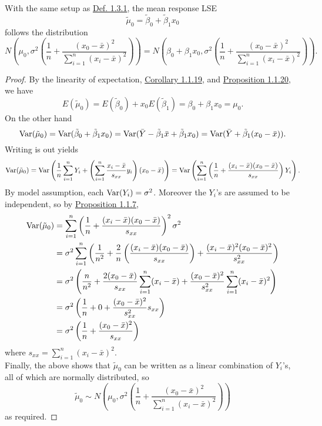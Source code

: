 \documentclass[11pt,fleqn]{book} %
\begin{document}
\begin{proposition} \label{prop:132}
With the same setup as \hyperref[def:131]{Def. 1.3.1}, the mean response LSE
\[
\tilde{\mu}_0 = \tilde{\beta}_0 + \tilde{\beta}_1x_0
\]
follows the distribution
\[
N\left(\mu_0, \sigma^2\left(\frac1n + \frac{(x_0 - \bar{x})^2}{\sum_{i=1}^n(x_i - \bar{x})^2}\right)\right) = N\left(\beta_0 + \beta_1x_0, \sigma^2\left(\frac1n + \frac{(x_0 - \bar{x})^2}{\sum_{i=1}^n(x_i - \bar{x})^2}\right)\right).
\]
\end{proposition}
\begin{proof} By the linearity of expectation, \hyperref[cor:1119]{Corollary 1.1.19}, and \hyperref[prop:1121]{Proposition 1.1.20}, we have
\[
E(\tilde{\mu}_0) = E(\tilde{\beta}_0) + x_0E(\tilde{\beta}_1) = \beta_0 + \beta_1x_0 = \mu_0.
\]
\indent On the other hand
\[
\operatorname{Var}(\tilde{\mu}_0) = \operatorname{Var}(\tilde{\beta}_0 + \tilde{\beta}_1x_0) = \operatorname{Var}(\bar{Y} - \tilde{\beta}_1\bar{x} + \tilde{\beta}_1x_0) = \operatorname{Var}(\bar{Y} + \tilde{\beta}_1(x_0 - \bar{x})).
\]
\indent Writing is out yields
\[
\operatorname{Var}(\tilde{\mu}_0) = \operatorname{Var}\left(\frac1n\sum_{i=1}^nY_i + \left(\sum_{i=1}^n\frac{x_i - \bar{x}}{s_{xx}}y_i\right)(x_0 - \bar{x})\right) = \operatorname{Var}\left(\sum_{i=1}^n\left(\frac1n + \frac{(x_i - \bar{x})(x_0 - \bar{x})}{s_{xx}}\right)Y_i\right).
\]
\indent By model assumption, each \(\operatorname{Var}(Y_i) = \sigma^2\). Moreover the \(Y_i\)'s are assumed to be independent, so by \hyperref[prop:117]{Proposition 1.1.7}, 
\[
\begin{aligned}
\operatorname{Var}(\tilde{\mu}_0) &= \sum_{i=1}^n\left(\frac1n + \frac{(x_i - \bar{x})(x_0 - \bar{x})}{s_{xx}}\right)^2\sigma^2 \\
&= \sigma^2\sum_{i=1}^n\left(\frac{1}{n^2} + \frac2n\left(\frac{(x_i - \bar{x})(x_0 - \bar{x})}{s_{xx}}\right) + \frac{(x_i - \bar{x})^2(x_0 - \bar{x})^2}{s_{xx}^2}\right) \\
&= \sigma^2\left(\frac{n}{n^2} + \frac{2(x_0 - \bar{x})}{s_{xx}}\sum_{i=1}^n(x_i - \bar{x}) + \frac{(x_0 - \bar{x})^2}{s_{xx}^2}\sum_{i=1}^n(x_i - \bar{x})^2\right) \\
&= \sigma^2\left(\frac1n + 0 + \frac{(x_0 - \bar{x})^2}{s_{xx}^2}s_{xx}\right) \\
&= \sigma^2\left(\frac1n + \frac{(x_0 - \bar{x})^2}{s_{xx}}\right)
\end{aligned}
\]
where \(s_{xx} = \sum_{i=1}^n(x_i - \bar{x})^2\). \\
\indent Finally, the above shows that \(\tilde{\mu}_0\) can be written as a linear combination of \(Y_i\)'s, all of which are normally distributed, so
\[
\tilde{\mu}_0 \sim N\left(\mu_0, \sigma^2\left(\frac1n + \frac{(x_0 - \bar{x})^2}{\sum_{i=1}^n(x_i - \bar{x})^2}\right)\right)
\]
as required.
\end{proof}
\end{document}
